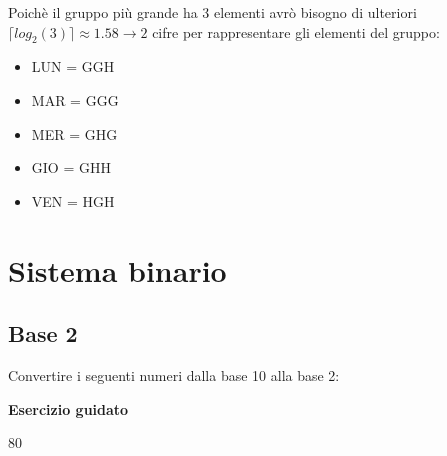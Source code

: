 \documentclass[11pt,fleqn]{book}
\begin{document}
\begin{esercizio}[1]
    Poichè il gruppo più grande ha 3 elementi avrò bisogno di ulteriori  $\lceil log_2{(3)} \rceil \approx 1.58 \xrightarrow{} 2$ cifre per rappresentare gli elementi del gruppo:

    \begin{itemize}
        \item LUN = GGH
        \item MAR = GGG
        \item MER = GHG
        \item GIO = GHH
        \item VEN = HGH
    \end{itemize}

\end{esercizio}

\newpage








\chapter{Sistema binario}

\section{Base 2}

Convertire i seguenti numeri dalla base 10 alla base 2:

\begin{esercizio}[1]
    \textbf{Esercizio guidato}
    
    80

    \immediate{}
    
\end{esercizio}
\end{document}

